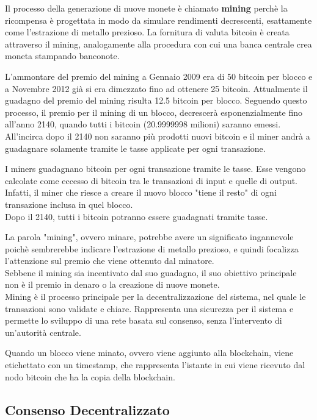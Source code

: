 Il processo della generazione di nuove monete è chiamato \textbf{mining} perchè la ricompensa è progettata in modo da simulare rendimenti decrescenti, esattamente come l'estrazione di metallo prezioso.
La fornitura di valuta bitcoin è creata attraverso il mining, analogamente alla procedura con cui una banca centrale crea moneta stampando banconote. 

L'ammontare del premio del mining a Gennaio 2009 era di 50 bitcoin per blocco e a Novembre 2012 già si era dimezzato fino ad ottenere 25 bitcoin. Attualmente il guadagno del premio del mining risulta 12.5 bitcoin per blocco.
Seguendo questo processo, il premio per il mining di un blocco, decrescerà esponenzialmente fino all'anno 2140, quando tutti i bitcoin (20.9999998 milioni) saranno emessi. All'incirca dopo il 2140 non saranno più prodotti nuovi bitcoin e il miner andrà a guadagnare solamente tramite le tasse applicate per ogni transazione.

I miners guadagnano bitcoin per ogni transazione tramite le tasse. Esse vengono calcolate come eccesso di bitcoin tra le transazioni di input e quelle di output. Infatti, il miner che riesce a creare il nuovo blocco "tiene il resto" di ogni transazione inclusa in quel blocco. \\ Dopo il 2140, tutti i bitcoin potranno essere guadagnati tramite tasse.

La parola "mining", ovvero minare, potrebbe avere un significato ingannevole poichè sembrerebbe indicare l'estrazione di metallo prezioso, e quindi focalizza l'attenzione sul premio che viene ottenuto dal minatore.\\
Sebbene il mining sia incentivato dal suo guadagno, il suo obiettivo principale non è il premio in denaro o la creazione di nuove monete.\\ 
Mining è il processo principale per la decentralizzazione del sistema, nel quale le transazioni sono validate e chiare. Rappresenta una sicurezza per il sistema e permette lo sviluppo di una rete basata sul consenso, senza l'intervento di un'autorità centrale.\cite{antonopoulos2014mastering}

Quando un blocco viene minato, ovvero viene aggiunto alla blockchain, viene etichettato con un timestamp, che rappresenta l'istante in cui viene ricevuto dal nodo bitcoin che ha la copia della blockchain.

\subsection{Consenso Decentralizzato}

